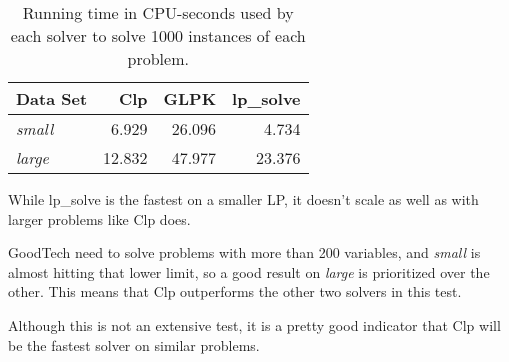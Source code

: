 \begin{table}[h!]
    \centering
    \caption{Running time in CPU-seconds used by each solver to solve 1000
             instances of each problem.}
    \begin{tabular}{lrrr}
        Data Set       & Clp    & GLPK   & lp\_solve \\ \hline
        \textit{small} & 6.929  & 26.096 & 4.734 \\
        \textit{large} & 12.832 & 47.977 & 23.376
    \end{tabular}
    \label{table:lpres}
\end{table}

While lp\_solve is the fastest on a smaller LP, it doesn't scale as well as
with larger problems like Clp does.

GoodTech need to solve problems with more than 200 variables, and
\textit{small} is almost hitting that lower limit, so a good result on
\textit{large} is prioritized over the other.
This means that Clp outperforms the other two solvers in this test.

Although this is not an extensive test, it is a pretty good indicator that Clp
will be the fastest solver on similar problems.
